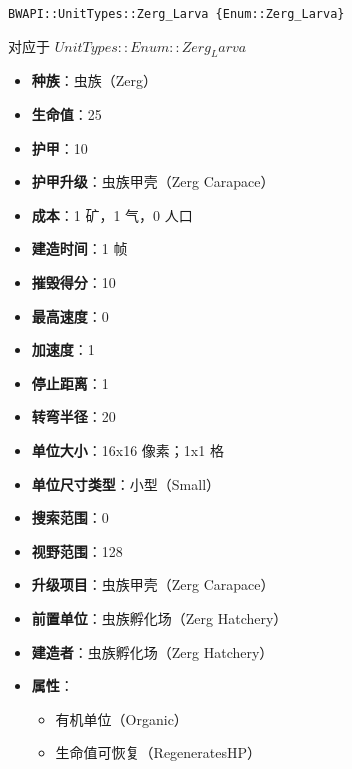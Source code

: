 \begin{tcolorbox}[colback=white, colframe=black!60!white, title=Zerg\_Larva(), arc=0mm]
    \begin{verbatim}
BWAPI::UnitTypes::Zerg_Larva {Enum::Zerg_Larva}
    \end{verbatim}
    对应于  $ UnitTypes::Enum::Zerg_Larva $ 
    \begin{itemize}
        \item \textbf{种族}：虫族（Zerg）
        \item \textbf{生命值}：25
        \item \textbf{护甲}：10
        \item \textbf{护甲升级}：虫族甲壳（Zerg Carapace）
        \item \textbf{成本}：1 矿，1 气，0 人口
        \item \textbf{建造时间}：1 帧
        \item \textbf{摧毁得分}：10
        \item \textbf{最高速度}：0
        \item \textbf{加速度}：1
        \item \textbf{停止距离}：1
        \item \textbf{转弯半径}：20
        \item \textbf{单位大小}：16x16 像素；1x1 格
        \item \textbf{单位尺寸类型}：小型（Small）
        \item \textbf{搜索范围}：0
        \item \textbf{视野范围}：128
        \item \textbf{升级项目}：虫族甲壳（Zerg Carapace）
        \item \textbf{前置单位}：虫族孵化场（Zerg Hatchery）
        \item \textbf{建造者}：虫族孵化场（Zerg Hatchery）
        \item \textbf{属性}：
            \begin{itemize}
                \item 有机单位（Organic）
                \item 生命值可恢复（RegeneratesHP）
            \end{itemize}
    \end{itemize}
\end{tcolorbox}

